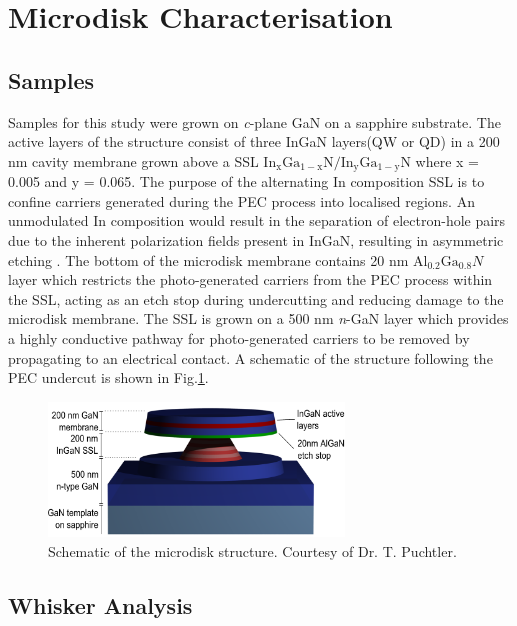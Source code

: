 \section[Experimental]{Microdisk Characterisation}
\subsection{Samples}
\label{microdisk samples}
Samples for this study were grown on \textit{c}-plane GaN on a sapphire substrate. The active layers of the structure consist of three InGaN layers(QW or QD) in a 200 nm cavity membrane grown above a SSL $\mathrm{In_{x}Ga_{1-x}N/In_{y}Ga_{1-y}N}$ where x = 0.005 and y = 0.065. The purpose of the alternating In composition SSL is to confine carriers generated during the PEC process into localised regions. An unmodulated In composition would result in the separation of electron-hole pairs due to the inherent polarization fields present in InGaN, resulting in asymmetric etching \cite{El-Ella2011a}. The bottom of the microdisk membrane contains 20 nm $\mathrm{Al_{0.2}Ga_{0.8}}N$ layer which restricts the photo-generated carriers from the PEC process within the SSL, acting as an etch stop during undercutting and reducing damage to the microdisk membrane. The SSL is grown on a 500 nm \textit{n}-GaN layer which provides a highly conductive pathway for photo-generated carriers to be removed by propagating to an electrical contact. A schematic of the structure following the PEC undercut is shown in Fig.\ref{Puchtlerudiskimage}.

\begin{figure}[ht]
	\centering
	\includegraphics[width=0.7\textwidth]{Figs/Ch4/puchtlerimage}
	\caption {Schematic of the microdisk structure. Courtesy of Dr. T. Puchtler.}
	\label{Puchtlerudiskimage}
\end{figure}
\FloatBarrier 
	

\subsection{Whisker Analysis}

